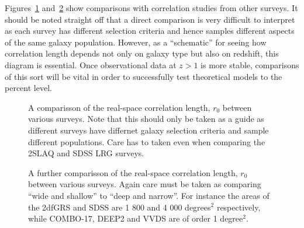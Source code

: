 \documentclass[usenatbib]{mn2e}
\begin{document}
Figures~\ref{fig:r_nought_z_labels} and~\ref{fig:r_nought_z}
show comparisons with correlation studies from other surveys. 
It should be noted straight off that
a direct comparison is very difficult to interpret as each survey 
has different selection criteria and hence samples different
 aspects of the same galaxy population. 
However, as a ``schematic'' for seeing how
correlation length depends not only on galaxy type but also on
redshift, this diagram is essential. 
Once observational data at $z > 1$ is more stable, 
comparisons of this sort will be vital in order to successfully test
theoretical models to the percent level. 

\begin{figure}
\centering
\centerline{}
\caption{A comparisson of the real-space correlation length, $r_{0}$ between
various surveys. Note that this should only be taken as a guide 
as different surveys have differnet galaxy selection criteria 
and sample different populations. 
Care has to taken even when comparing the 2SLAQ and SDSS LRG surveys.}
\label{fig:r_nought_z_labels}
\end{figure}

\begin{figure}
\centering
\centerline{}
\caption{A further comparisson of the real-space correlation length, 
$r_{0}$ between various surveys. 
Again care must be taken as comparing ``wide and shallow'' to ``deep and
narrow''. For instance the areas of the 2dfGRS and SDSS 
are 1 800 and 4 000 degrees$^{2}$ respectively, while COMBO-17, 
DEEP2 and VVDS are of order 1 degree$^{2}$.}
\label{fig:r_nought_z}
\end{figure}
\end{document}
